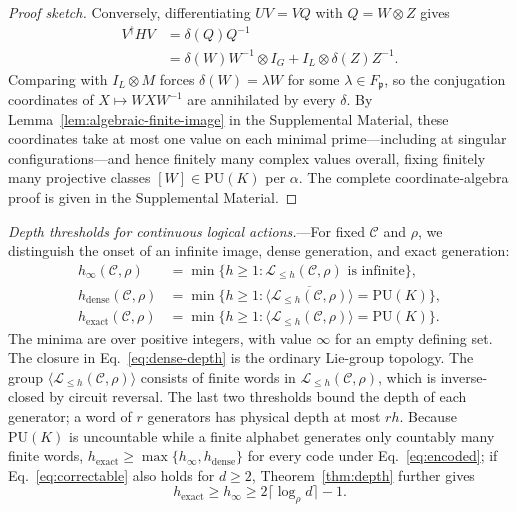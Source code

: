 \documentclass[aps,prl,reprint,notitlepage,nofootinbib,nobibnotes]{revtex4-2}
\newcommand{\PU}{\mathrm{PU}}
\newcommand{\id}{I}
\begin{document}
\begin{proof}[Proof sketch]
Conversely, differentiating \(UV=VQ\) with \(Q=W\otimes Z\) gives
\begin{align*}
 V^\dagger HV &= \delta(Q)Q^{-1} \\
  &= \delta(W)W^{-1}\otimes\id_G+\id_L\otimes\delta(Z)Z^{-1}.
\end{align*}
Comparing with \(\id_L\otimes M\) forces \(\delta(W)=\lambda W\) for some \(\lambda\in F_{\mathfrak p}\), so the conjugation coordinates of \(X\mapsto WXW^{-1}\) are annihilated by every \(\delta\). By Lemma~\ref{lem:algebraic-finite-image} in the Supplemental Material, these coordinates take at most one value on each minimal prime---including at singular configurations---and hence finitely many complex values overall, fixing finitely many projective classes \([W]\in\PU(K)\) per \(\alpha\). The complete coordinate-algebra proof is given in the Supplemental Material.
\end{proof}

\textit{Depth thresholds for continuous logical actions.}---For fixed \(\mathcal C\) and \(\rho\), we distinguish the onset of an infinite image, dense generation, and exact generation:
\begin{align}
 h_\infty(\mathcal C,\rho)
 &=\min\{h\ge1:\mathcal L_{\le h}(\mathcal C,\rho)\text{ is infinite}\},
 \label{eq:critical-definition}\\
 h_{\mathrm{dense}}(\mathcal C,\rho)
 &=\min\{h\ge1:\overline{\langle \mathcal L_{\le h}(\mathcal C,\rho)\rangle}=\PU(K)\},
 \label{eq:dense-depth}\\
 h_{\mathrm{exact}}(\mathcal C,\rho)
 &=\min\{h\ge1:\langle \mathcal L_{\le h}(\mathcal C,\rho)\rangle=\PU(K)\}.
 \label{eq:exact-depth}
\end{align}
The minima are over positive integers, with value \(\infty\) for an empty defining set. The closure in Eq.~\eqref{eq:dense-depth} is the ordinary Lie-group topology. The group \(\langle \mathcal L_{\le h}(\mathcal C,\rho)\rangle\) consists of finite words in \(\mathcal L_{\le h}(\mathcal C,\rho)\), which is inverse-closed by circuit reversal. The last two thresholds bound the depth of each generator; a word of \(r\) generators has physical depth at most \(rh\). Because \(\PU(K)\) is uncountable while a finite alphabet generates only countably many finite words, \(h_{\mathrm{exact}}\ge\max\{h_\infty,h_{\mathrm{dense}}\}\) for every code under Eq.~\eqref{eq:encoded}; if Eq.~\eqref{eq:correctable} also holds for \(d\ge2\), Theorem~\ref{thm:depth} further gives
\begin{equation}\label{eq:critical-lower}
 h_{\mathrm{exact}}\ge h_\infty
 \ge2\lceil\log_\rho d\rceil-1.
\end{equation}
\end{document}
